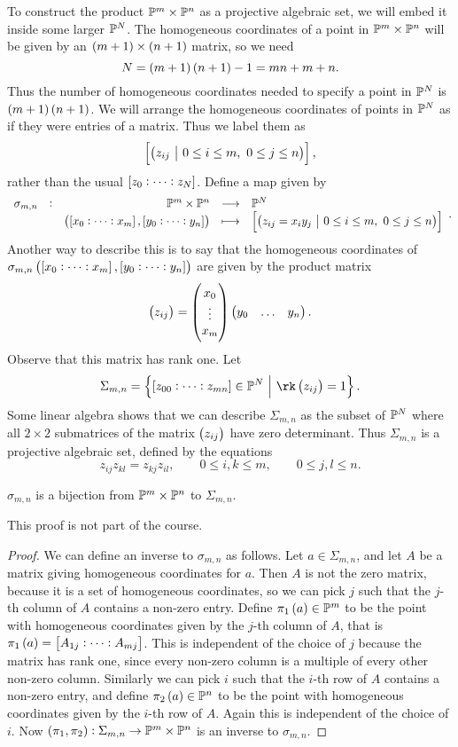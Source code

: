 To construct the product $ \mathbb{P}^m \times \mathbb{P}^n $ as a projective algebraic set, we will embed it inside some larger $ \mathbb{P}^N $. The homogeneous coordinates of a point in $ \mathbb{P}^m \times \mathbb{P}^n $ will be given by an $ \br{m + 1} \times \br{n + 1} $ matrix, so we need
$$ N = \br{m + 1}\br{n + 1} - 1 = mn + m + n. $$
Thus the number of homogeneous coordinates needed to specify a point in $ \mathbb{P}^N $ is $ \br{m + 1}\br{n + 1} $. We will arrange the homogeneous coordinates of points in $ \mathbb{P}^N $ as if they were entries of a matrix. Thus we label them as
$$ \sbr{\br{z_{ij} \st 0 \le i \le m, \ 0 \le j \le n}}, $$
rather than the usual $ \sbr{z_0 : \dots : z_N} $. Define a map given by
$$ \function[\sigma_{m, n}]{\PP^m \times \PP^n}{\PP^N}{\br{\sbr{x_0 : \dots : x_m}, \sbr{y_0 : \dots : y_n}}}{\sbr{\br{z_{ij} = x_iy_j \st 0 \le i \le m, \ 0 \le j \le n}}}. $$
Another way to describe this is to say that the homogeneous coordinates of $ \sigma_{m, n}\br{\sbr{x_0 : \dots : x_m}, \sbr{y_0 : \dots : y_n}} $ are given by the product matrix
$$ \br{z_{ij}} = \threebyone{x_0}{\vdots}{x_m}\onebythree{y_0}{\dots}{y_n}. $$
Observe that this matrix has rank one. Let
$$ \Sigma_{m, n} = \cbr{\sbr{z_{00} : \dots : z_{mn}} \in \PP^N \st \rk \br{z_{ij}} = 1}. $$
Some linear algebra shows that we can describe $ \Sigma_{m, n} $ as the subset of $ \mathbb{P}^N $ where all $ 2 \times 2 $ submatrices of the matrix $ \br{z_{ij}} $ have zero determinant. Thus $ \Sigma_{m, n} $ is a projective algebraic set, defined by the equations
$$ z_{ij}z_{kl} = z_{kj}z_{il}, \qquad 0 \le i, k \le m, \qquad 0 \le j, l \le n. $$

\begin{lemma}
$ \sigma_{m, n} $ is a bijection from $ \mathbb{P}^m \times \mathbb{P}^n $ to $ \Sigma_{m, n} $.
\end{lemma}

This proof is not part of the course.

\begin{proof}
We can define an inverse to $ \sigma_{m, n} $ as follows. Let $ a \in \Sigma_{m, n} $, and let $ A $ be a matrix giving homogeneous coordinates for $ a $. Then $ A $ is not the zero matrix, because it is a set of homogeneous coordinates, so we can pick $ j $ such that the $ j $-th column of $ A $ contains a non-zero entry. Define $ \pi_1\br{a} \in \PP^m $ to be the point with homogeneous coordinates given by the $ j $-th column of $ A $, that is $ \pi_1\br{a} = \sbr{A_{1j} : \dots : A_{mj}} $. This is independent of the choice of $ j $ because the matrix has rank one, since every non-zero column is a multiple of every other non-zero column. Similarly we can pick $ i $ such that the $ i $-th row of $ A $ contains a non-zero entry, and define $ \pi_2\br{a} \in \PP^n $ to be the point with homogeneous coordinates given by the $ i $-th row of $ A $. Again this is independent of the choice of $ i $. Now $ \br{\pi_1, \pi_2} : \Sigma_{m, n} \to \PP^m \times \PP^n $ is an inverse to $ \sigma_{m, n} $.
\end{proof}

